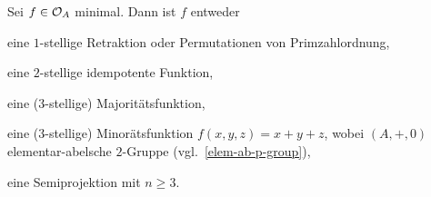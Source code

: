 \documentclass{book}
\begin{document}
\begin{theorem}
    Sei $f\in\mathcal{O}_A$ minimal. Dann ist $f$ entweder
    \begin{statements}
            \item\label{case-1} eine $1$-stellige Retraktion oder Permutationen von Primzahlordnung,
            \item\label{case-2} eine $2$-stellige idempotente Funktion,
            \item\label{case-3} eine ($3$-stellige) Majoritätsfunktion,
            \item\label{case-4} eine ($3$-stellige) Minorätsfunktion $f(x,y,z)=x+y+z$, wobei $(A,+,0)$ elementar-abelsche $2$-Gruppe (vgl.\ \autoref{elem-ab-p-group}),%
            \item\label{case-5} eine Semiprojektion mit $n\geq 3$.
    \end{statements}
\end{theorem}
\end{document}
